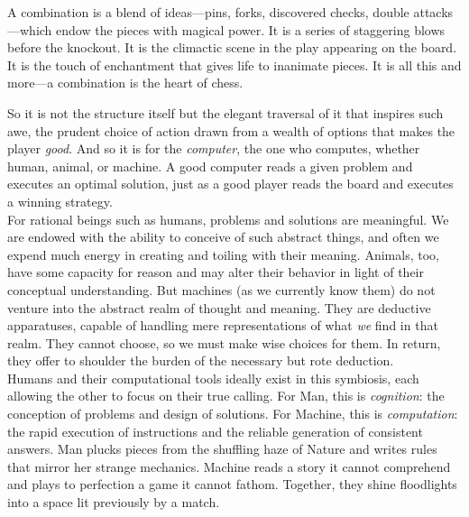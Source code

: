 \begin{displayquote}
	A combination is a blend of ideas---pins, forks, discovered checks, double attacks---which endow the pieces with magical power. It is a series of staggering blows before the knockout. It is the climactic scene in the play appearing on the board. It is the touch of enchantment that gives life to inanimate pieces. It is all this and more---a combination is the heart of chess. \\
\end{displayquote}

So it is not the structure itself but the elegant traversal of it that inspires such awe, the prudent choice of action drawn from a wealth of options that makes the player \textit{good}. And so it is for the \textit{computer}, the one who computes, whether human, animal, or machine. A good computer reads a given problem and executes an optimal solution, just as a good player reads the board and executes a winning strategy. \\

For rational beings such as humans, problems and solutions are meaningful. We are endowed with the ability to conceive of such abstract things, and often we expend much energy in creating and toiling with their meaning. Animals, too, have some capacity for reason and may alter their behavior in light of their conceptual understanding. But machines (as we currently know them) do not venture into the abstract realm of thought and meaning. They are deductive apparatuses, capable of handling mere representations of what \textit{we} find in that realm. They cannot choose, so we must make wise choices for them. In return, they offer to shoulder the burden of the necessary but rote deduction. \\

Humans and their computational tools ideally exist in this symbiosis, each allowing the other to focus on their true calling. For Man, this is \textit{cognition}: the conception of problems and design of solutions. For Machine, this is \textit{computation}: the rapid execution of instructions and the reliable generation of consistent answers. Man plucks pieces from the shuffling haze of Nature and writes rules that mirror her strange mechanics. Machine reads a story it cannot comprehend and plays to perfection a game it cannot fathom. Together, they shine floodlights into a space lit previously by a match. \\


